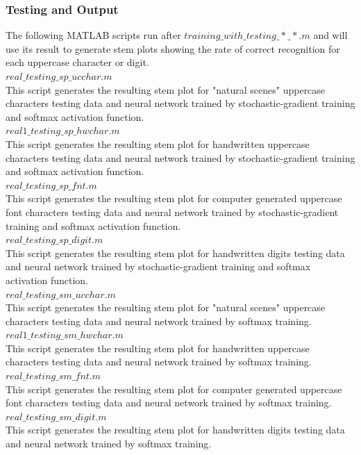 \documentclass[journal,a4paper,onecolumn,11pt]{IEEEtran}
\begin{document}
\subsubsection{Testing and Output}
The following MATLAB scripts run after $training\_with\_testing\_*\_*.m$ and will use its result to generate stem plots showing the rate of correct recognition for each uppercase character or digit.\\
$real\_testing\_sp\_ucchar.m$\\
This script generates the resulting stem plot for "natural scenes" uppercase characters testing data and neural network trained by stochastic-gradient training and softmax activation function.\\ 
$real1\_testing\_sp\_hwchar.m$\\
This script generates the resulting stem plot for handwritten uppercase characters testing data and neural network trained by stochastic-gradient training and softmax activation function.\\ 
$real\_testing\_sp\_fnt.m$\\
This script generates the resulting stem plot for  computer generated uppercase font characters testing data and neural network trained by stochastic-gradient training and softmax activation function.\\ 
$real\_testing\_sp\_digit.m$\\
This script generates the resulting stem plot for handwritten digits testing data and neural network trained by stochastic-gradient training and softmax activation function.\\ 
$real\_testing\_sm\_ucchar.m$\\
This script generates the resulting stem plot for "natural scenes" uppercase characters testing data and neural network trained by softmax training.\\ 
$real1\_testing\_sm\_hwchar.m$\\
This script generates the resulting stem plot for handwritten uppercase characters testing data and neural network trained by softmax training.\\ 
$real\_testing\_sm\_fnt.m$\\
This script generates the resulting stem plot for  computer generated uppercase font characters testing data and neural network trained by softmax training.\\ 
$real\_testing\_sm\_digit.m$\\
This script generates the resulting stem plot for handwritten digits testing data and neural network trained by softmax training.\\ 
\end{document}
